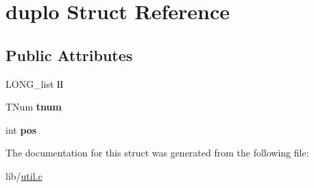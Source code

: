 \hypertarget{structduplo}{}\section{duplo Struct Reference}
\label{structduplo}
\subsection*{Public Attributes}
\begin{DoxyCompactItemize}
\item 
L\+O\+N\+G\+\_\+list {\bfseries ll}\hypertarget{structduplo_ab8f2e221e0498f8fdffb15e476d24496}{}\label{structduplo_ab8f2e221e0498f8fdffb15e476d24496}

\item 
T\+Num {\bfseries tnum}\hypertarget{structduplo_a96309c6acf504637d0b13d6bb0b5f2db}{}\label{structduplo_a96309c6acf504637d0b13d6bb0b5f2db}

\item 
int {\bfseries pos}\hypertarget{structduplo_a961c7fa25d1753417ad3eb7621868a38}{}\label{structduplo_a961c7fa25d1753417ad3eb7621868a38}

\end{DoxyCompactItemize}


The documentation for this struct was generated from the following file\+:\begin{DoxyCompactItemize}
\item 
lib/\hyperlink{util_8c}{util.\+c}\end{DoxyCompactItemize}
